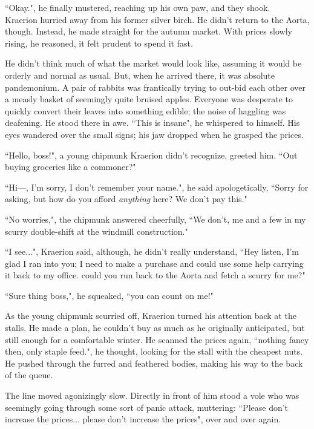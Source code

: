``Okay.", he finally mustered, reaching up his own paw, and they shook.\\

Kraerion hurried away from his former silver birch. He didn't return to the Aorta, though. Instead, he made straight for the autumn market. With prices slowly rising, he reasoned, it felt prudent to spend it fast.

He didn't think much of what the market would look like, assuming it would be orderly and normal as usual. But, when he arrived there, it was absolute pandemonium. A pair of rabbits was frantically trying to out-bid each other over a measly basket of seemingly quite bruised apples. Everyone was desperate to quickly convert their leaves into something edible; the noise of haggling was deafening. He stood there in awe. ``This is insane", he whispered to himself.
His eyes wandered over the small signs; his jaw dropped when he grasped the prices.

``Hello, boss!", a young chipmunk Kraerion didn't recognize, greeted him. ``Out buying groceries like a commoner?"

``Hi---, I'm sorry, I don't remember your name.", he said apologetically, ``Sorry for asking, but how do you afford \textit{anything} here? We don't pay this."

``No worries,", the chipmunk answered cheerfully, ``We don't, me and a few in my scurry double-shift at the windmill construction."

``I see...", Kraerion said, although, he didn't really understand, ``Hey listen, I'm glad I ran into you; I need to make a purchase and could use some help carrying it back to my office. could you run back to the Aorta and fetch a scurry for me?"

``Sure thing boss,", he squeaked, ``you can count on me!"

As the young chipmunk scurried off, Kraerion turned his attention back at the stalls. He made a plan, he couldn't buy as much as he originally anticipated, but still enough for a comfortable winter. He scanned the prices again, ``nothing fancy then, only staple feed.", he thought, looking for the stall with the cheapest nuts. He pushed through the furred and feathered bodies, making his way to the back of the queue.

The line moved agonizingly slow. Directly in front of him stood a vole who was seemingly going through some sort of panic attack, muttering: ``Please don't increase the prices... please don't increase the prices", over and over again.

